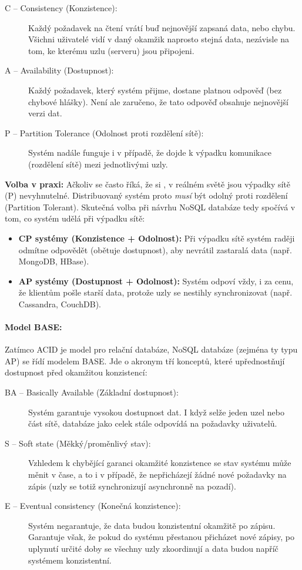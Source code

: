 \begin{description}
    \item[C -- Consistency (Konzistence):] Každý požadavek na čtení vrátí buď nejnovější zapsaná data, nebo chybu. Všichni uživatelé vidí v daný okamžik naprosto stejná data, nezávisle na tom, ke kterému uzlu (serveru) jsou připojeni.
    \item[A -- Availability (Dostupnost):] Každý požadavek, který systém přijme, dostane platnou odpověď (bez chybové hlášky). Není ale zaručeno, že tato odpověď obsahuje nejnovější verzi dat.
    \item[P -- Partition Tolerance (Odolnost proti rozdělení sítě):] Systém nadále funguje i v případě, že dojde k výpadku komunikace (rozdělení sítě) mezi jednotlivými uzly.
\end{description}

\textbf{Volba v praxi:} Ačkoliv se často říká, že si , v reálném světě jsou výpadky sítě (P) nevyhnutelné. Distribuovaný systém proto \textit{musí} být odolný proti rozdělení (Partition Tolerant). Skutečná volba při návrhu NoSQL databáze tedy spočívá v tom, co systém udělá při výpadku sítě:
\begin{itemize}
    \item \textbf{CP systémy (Konzistence + Odolnost):} Při výpadku sítě systém raději odmítne odpovědět (obětuje dostupnost), aby nevrátil zastaralá data (např. MongoDB, HBase).
    \item \textbf{AP systémy (Dostupnost + Odolnost):} Systém odpoví vždy, i za cenu, že klientům pošle starší data, protože uzly se nestihly synchronizovat (např. Cassandra, CouchDB).
\end{itemize}

\paragraph*{Model BASE:}
Zatímco ACID je model pro relační databáze, NoSQL databáze (zejména ty typu AP) se řídí modelem BASE. Jde o akronym tří konceptů, které upřednostňují dostupnost před okamžitou konzistencí:

\begin{description}
    \item[BA -- Basically Available (Základní dostupnost):] Systém garantuje vysokou dostupnost dat. I když selže jeden uzel nebo část sítě, databáze jako celek stále odpovídá na požadavky uživatelů.
    \item[S -- Soft state (Měkký/proměnlivý stav):] Vzhledem k chybějící garanci okamžité konzistence se stav systému může měnit v čase, a to i v případě, že nepřicházejí žádné nové požadavky na zápis (uzly se totiž synchronizují asynchronně na pozadí).
    \item[E -- Eventual consistency (Konečná konzistence):] Systém negarantuje, že data budou konzistentní okamžitě po zápisu. Garantuje však, že pokud do systému přestanou přicházet nové zápisy, po uplynutí určité doby se všechny uzly zkoordinují a data budou napříč systémem konzistentní.
\end{description}

